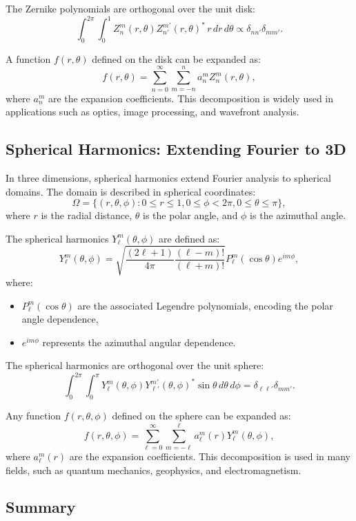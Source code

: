 The Zernike polynomials are orthogonal over the unit disk:
\[
\int_0^{2\pi} \int_0^1 Z_n^m(r, \theta) Z_{n'}^{m'}(r, \theta)^* \, r \, dr \, d\theta \propto \delta_{nn'} \delta_{mm'}.
\]

A function \( f(r, \theta) \) defined on the disk can be expanded as:
\[
f(r, \theta) = \sum_{n=0}^\infty \sum_{m=-n}^n a_n^m Z_n^m(r, \theta),
\]
where \( a_n^m \) are the expansion coefficients. This decomposition is widely used in applications such as optics, image processing, and wavefront analysis.

\subsection{Spherical Harmonics: Extending Fourier to 3D}

In three dimensions, spherical harmonics extend Fourier analysis to spherical domains. The domain is described in spherical coordinates:
\[
\Omega = \{(r, \theta, \phi) : 0 \leq r \leq 1, 0 \leq \phi < 2\pi, 0 \leq \theta \leq \pi\},
\]
where \( r \) is the radial distance, \( \theta \) is the polar angle, and \( \phi \) is the azimuthal angle.

The spherical harmonics \( Y_\ell^m(\theta, \phi) \) are defined as:
\[
Y_\ell^m(\theta, \phi) = \sqrt{\frac{(2\ell+1)}{4\pi} \frac{(\ell-m)!}{(\ell+m)!}} P_\ell^m(\cos\theta) e^{i m \phi},
\]
where:
\begin{itemize}
    \item \( P_\ell^m(\cos\theta) \) are the associated Legendre polynomials, encoding the polar angle dependence,
    \item \( e^{i m \phi} \) represents the azimuthal angular dependence.
\end{itemize}

The spherical harmonics are orthogonal over the unit sphere:
\[
\int_0^{2\pi} \int_0^\pi Y_\ell^m(\theta, \phi) Y_{\ell'}^{m'}(\theta, \phi)^* \sin\theta \, d\theta \, d\phi = \delta_{\ell \ell'} \delta_{m m'}.
\]

Any function \( f(r, \theta, \phi) \) defined on the sphere can be expanded as:
\[
f(r, \theta, \phi) = \sum_{\ell=0}^\infty \sum_{m=-\ell}^\ell a_\ell^m(r) Y_\ell^m(\theta, \phi),
\]
where \( a_\ell^m(r) \) are the expansion coefficients. This decomposition is used in many fields, such as quantum mechanics, geophysics, and electromagnetism.

\subsection{Summary}

